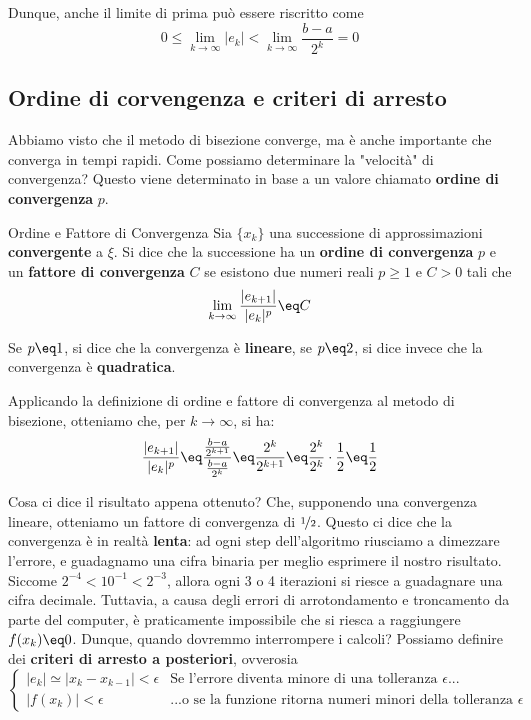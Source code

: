 Dunque, anche il limite di prima può essere riscritto come
\[ 0 \leq \lim_{k \to \infty} |e_k| < \lim_{k \to \infty} \frac{b - a}{2^k} = 0 \]

\subsection{Ordine di corvengenza e criteri di arresto}

Abbiamo visto che il metodo di bisezione converge, ma è anche importante che converga in tempi rapidi. Come possiamo determinare la "velocità" di convergenza? Questo viene determinato in base a un valore chiamato \textbf{ordine di convergenza} $p$.

\begin{definition}{Ordine e Fattore di Convergenza}
    Sia $\{ x_k \}$ una successione di approssimazioni \textbf{convergente} a $\xi$. Si dice che la successione ha un \textbf{ordine di convergenza} $p$ e un \textbf{fattore di convergenza} $C$ se esistono due numeri reali $p \geq 1$ e $C > 0$ tali che
    \[ \lim_{k \to \infty} \frac{|e_{k + 1}|}{|e_k|^p} \eq C \]

    Se $p \eq 1$, si dice che la convergenza è \textbf{lineare}, se $p \eq 2$, si dice invece che la convergenza è \textbf{quadratica}.
\end{definition}

Applicando la definizione di ordine e fattore di convergenza al metodo di bisezione, otteniamo che, per $k \to \infty$, si ha:
\[ \frac{|e_{k + 1}|}{|e_k|^p} \eq \frac{\frac{b - a}{2^{k + 1}}}{\frac{b - a}{2^k}} \eq \frac{2^k}{2^{k + 1}} \eq \frac{2^k}{2^k} \cdot \frac{1}{2} \eq \frac{1}{2} \]

Cosa ci dice il risultato appena ottenuto? Che, supponendo una convergenza lineare, otteniamo un fattore di convergenza di $\nicefrac{1}{2}$. Questo ci dice che la convergenza è in realtà \textbf{lenta}: ad ogni step dell'algoritmo riusciamo a dimezzare l'errore, e guadagnamo una cifra binaria per meglio esprimere il nostro risultato. Siccome $2^{-4} < 10^{-1} < 2^{-3}$, allora ogni 3 o 4 iterazioni si riesce a guadagnare una cifra decimale.
\nwl
Tuttavia, a causa degli errori di arrotondamento e troncamento da parte del computer, è praticamente impossibile che si riesca a raggiungere $f(x_k) \eq 0$. Dunque, quando dovremmo interrompere i calcoli? Possiamo definire dei \textbf{criteri di arresto a posteriori}, ovverosia
\[ \begin{cases}
|e_k| \simeq |x_k - x_{k - 1}| < \epsilon & \text{Se l'errore diventa minore di una tolleranza } \epsilon ... \\
|f(x_k)| < \epsilon & \text{...o se la funzione ritorna numeri minori della tolleranza } \epsilon
\end{cases} \]

